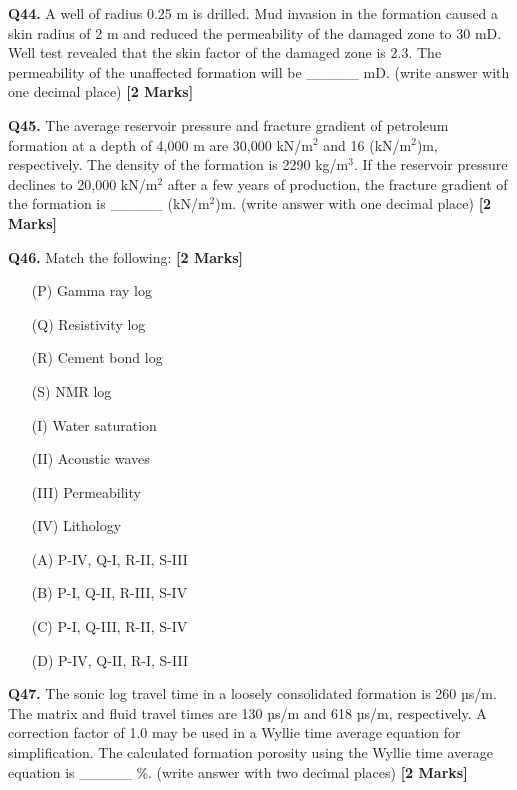 \documentclass[11pt]{article}
\newcommand{\questionb}[2]{
    \noindent\textbf{Q#2.} #1 \hfill \textbf{[2 Marks]}
}
\begin{document}
\questionb{A well of radius 0.25 m is drilled. Mud invasion in the formation caused a skin radius of 2 m and reduced the permeability of the damaged zone to 30 mD. Well test revealed that the skin factor of the damaged zone is 2.3. The permeability of the unaffected formation will be \_\_\_\_\_ mD. (write answer with one decimal place)}{44}
\vspace{0.5cm}

\questionb{The average reservoir pressure and fracture gradient of petroleum formation at a depth of 4,000 m are 30,000 kN/m\(^2\) and 16 (kN/m\(^2\))m, respectively. The density of the formation is 2290 kg/m\(^3\). If the reservoir pressure declines to 20,000 kN/m\(^2\) after a few years of production, the fracture gradient of the formation is \_\_\_\_\_ (kN/m\(^2\))m. (write answer with one decimal place)}{45}
\vspace{0.5cm}

\questionb{Match the following:}{46}
\begin{enumerate}
    \item[(P)] Gamma ray log
    \item[(Q)] Resistivity log
    \item[(R)] Cement bond log
    \item[(S)] NMR log
    \item[(I)] Water saturation
    \item[(II)] Acoustic waves
    \item[(III)] Permeability
    \item[(IV)] Lithology
    \item[(A)] P-IV, Q-I, R-II, S-III
    
    \item[(B)] P-I, Q-II, R-III, S-IV
    \item[(C)] P-I, Q-III, R-II, S-IV
    \item[(D)] P-IV, Q-II, R-I, S-III
\end{enumerate}
\vspace{0.5cm}

\questionb{The sonic log travel time in a loosely consolidated formation is 260 µs/m. The matrix and fluid travel times are 130 µs/m and 618 µs/m, respectively. A correction factor of 1.0 may be used in a Wyllie time average equation for simplification. The calculated formation porosity using the Wyllie time average equation is \_\_\_\_\_ \%. (write answer with two decimal places)}{47}
\vspace{0.5cm}
\end{document}
